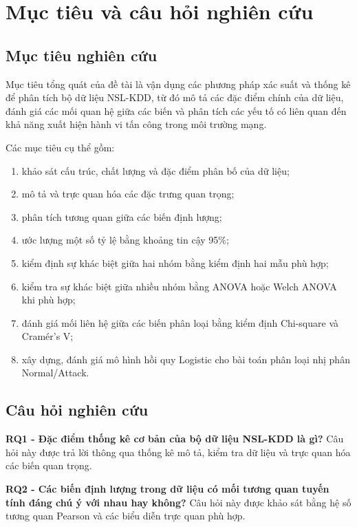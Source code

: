\documentclass[../main.tex]{subfiles}
\begin{document}
\section{Mục tiêu và câu hỏi nghiên cứu}

\subsection{Mục tiêu nghiên cứu}

Mục tiêu tổng quát của đề tài là vận dụng các phương pháp xác suất và thống kê để phân tích bộ dữ liệu NSL-KDD, từ đó mô tả các đặc điểm chính của dữ liệu, đánh giá các mối quan hệ giữa các biến và phân tích các yếu tố có liên quan đến khả năng xuất hiện hành vi tấn công trong môi trường mạng.

Các mục tiêu cụ thể gồm:
\begin{enumerate}
    \item khảo sát cấu trúc, chất lượng và đặc điểm phân bố của dữ liệu;
    \item mô tả và trực quan hóa các đặc trưng quan trọng;
    \item phân tích tương quan giữa các biến định lượng;
    \item ước lượng một số tỷ lệ bằng khoảng tin cậy 95\%;
    \item kiểm định sự khác biệt giữa hai nhóm bằng kiểm định hai mẫu phù hợp;
    \item kiểm tra sự khác biệt giữa nhiều nhóm bằng ANOVA hoặc Welch ANOVA khi phù hợp;
    \item đánh giá mối liên hệ giữa các biến phân loại bằng kiểm định Chi-square và Cramér's V;
    \item xây dựng, đánh giá mô hình hồi quy Logistic cho bài toán phân loại nhị phân Normal/Attack.
\end{enumerate}

\subsection{Câu hỏi nghiên cứu}

\textbf{RQ1 - Đặc điểm thống kê cơ bản của bộ dữ liệu NSL-KDD là gì?} Câu hỏi này được trả lời thông qua thống kê mô tả, kiểm tra dữ liệu và trực quan hóa các biến quan trọng.

\textbf{RQ2 - Các biến định lượng trong dữ liệu có mối tương quan tuyến tính đáng chú ý với nhau hay không?} Câu hỏi này được khảo sát bằng hệ số tương quan Pearson và các biểu diễn trực quan phù hợp.
\end{document}
